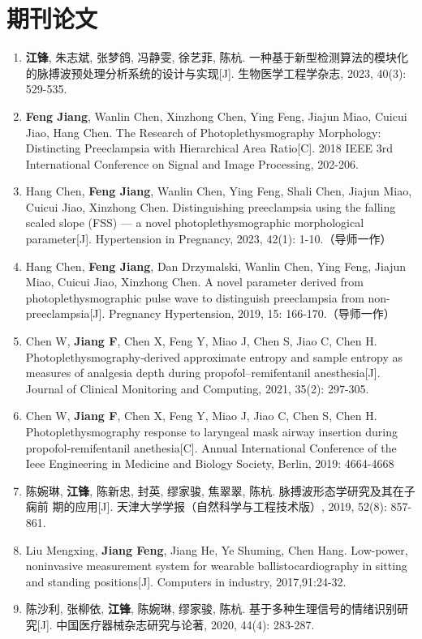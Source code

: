 {%
    \section*{期刊论文}
    \begin{enumerate}
        \item \textbf{江锋}, 朱志斌, 张梦鸽, 冯静雯, 徐艺菲, 陈杭. 一种基于新型检测算法的模块化的脉搏波预处理分析系统的设计与实现[J]. 
        生物医学工程学杂志, 2023, 40(3): 529-535.
        \item \textbf{Feng Jiang}, Wanlin Chen, Xinzhong Chen, Ying Feng, Jiajun Miao, Cuicui Jiao, Hang Chen. The Research of 
        Photoplethysmography Morphology: Distincting Preeclampsia with Hierarchical Area Ratio[C]. 
        2018 IEEE 3rd International Conference on Signal and Image Processing, 202-206.
        \item Hang Chen, \textbf{Feng Jiang}, Wanlin Chen, Ying Feng, Shali Chen, Jiajun Miao, Cuicui Jiao, Xinzhong Chen. 
        Distinguishing preeclampsia using the falling scaled slope (FSS) --- a novel photoplethysmographic morphological parameter[J]. 
        Hypertension in Pregnancy, 2023, 42(1): 1-10.（导师一作）
        \item Hang Chen, \textbf{Feng Jiang}, Dan Drzymalski, Wanlin Chen, Ying Feng, Jiajun Miao, Cuicui Jiao, Xinzhong Chen. 
        A novel parameter derived from photoplethysmographic pulse wave to distinguish preeclampsia from non-preeclampsia[J]. 
        Pregnancy Hypertension, 2019, 15: 166-170.（导师一作）
        \item Chen W, \textbf{Jiang F}, Chen X, Feng Y, Miao J, Chen S, Jiao C, Chen H.
        Photoplethysmography‑derived approximate entropy and sample entropy as measures of
        analgesia depth during propofol–remifentanil anesthesia[J]. Journal of Clinical Monitoring
        and Computing, 2021, 35(2): 297-305.
        \item Chen W, \textbf{Jiang F}, Chen X, Feng Y, Miao J, Jiao C, Chen S, Chen H. Photoplethysmography
        response to laryngeal mask airway insertion during propofol-remifentanil anethesia[C].
        Annual International Conference of the Ieee Engineering in Medicine and Biology Society,
        Berlin, 2019: 4664-4668
        \item 陈婉琳, \textbf{江锋}, 陈新忠, 封英, 缪家骏, 焦翠翠, 陈杭. 脉搏波形态学研究及其在子痫前
        期的应用[J]. 天津大学学报（自然科学与工程技术版）, 2019, 52(8): 857-861.
        \item Liu Mengxing, \textbf{Jiang Feng}, Jiang He, Ye Shuming, Chen Hang. 
        Low-power, noninvasive measurement system for wearable ballistocardiography in sitting and standing positions[J]. 
        Computers in industry, 2017,91:24-32.
        \item 陈沙利, 张柳依, \textbf{江锋}, 陈婉琳, 缪家骏, 陈杭. 基于多种生理信号的情绪识别研究[J]. 中国医疗器械杂志研究与论著, 2020, 44(4): 283-287.
    \end{enumerate}

}
